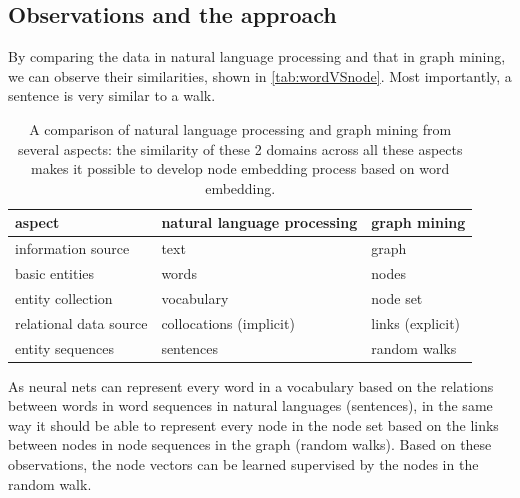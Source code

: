 \documentclass{article}
\begin{document}
\subsection{Observations and the approach}
By comparing the data in natural language processing and that in graph mining, we can observe their similarities, shown in \autoref{tab:wordVSnode}. Most importantly, a sentence is very similar to a walk.
\begin{table}[h]
	\centering
	\begin{tabularx}{\textwidth}{ |X|X|X| } \hline
		aspect  & natural language processing & graph mining \\ \hline
		information source & text & graph \\ \hline
		basic entities & words & nodes \\ \hline
		entity collection & vocabulary & node set \\ \hline
		relational data source & collocations (implicit) & links (explicit) \\ \hline
		entity sequences & sentences & random walks \\ \hline
	\end{tabularx}
	\caption{A comparison of natural language processing and graph mining from several aspects: the similarity of these 2 domains across all these aspects makes it possible to develop node embedding process based on word embedding.}
	\label{tab:wordVSnode}
\end{table}
As neural nets can represent every word in a vocabulary based on the relations between words in word sequences in natural languages (sentences), in the same way it should be able to represent every node in the node set based on the links between nodes in node sequences in the graph (random walks). Based on these observations, the node vectors can be learned supervised by the nodes in the random walk.
\end{document}

